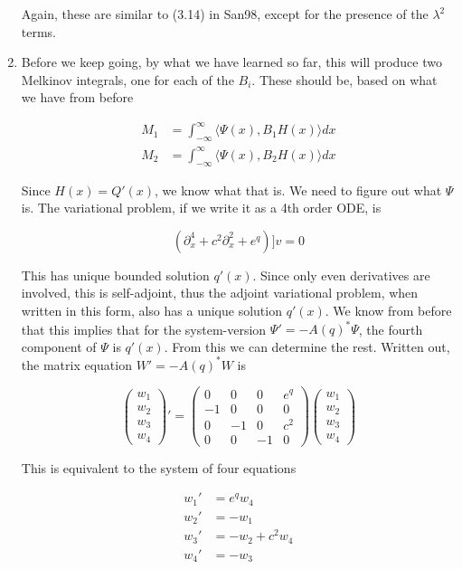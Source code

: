 \documentclass[12pt]{article}
\begin{document}
\begin{enumerate}
Again, these are similar to (3.14) in San98, except for the presence of the $\lambda^2$ terms.\\

\item Before we keep going, by what we have learned so far, this will produce two Melkinov integrals, one for each of the $B_i$. These should be, based on what we have from before

\begin{align*}
M_1 &= \int_{-\infty}^\infty \langle \Psi(x), B_1 H(x) \rangle dx \\
M_2 &= \int_{-\infty}^\infty \langle \Psi(x), B_2 H(x) \rangle dx
\end{align*}

Since $H(x) = Q'(x)$, we know what that is. We need to figure out what $\Psi$ is. The variational problem, if we write it as a 4th order ODE, is

\[
(\partial_x^4 + c^2 \partial_x^2 + e^{q})]v = 0
\]

This has unique bounded solution $q'(x)$. Since only even derivatives are involved, this is self-adjoint, thus the adjoint variational problem, when written in this form, also has a unique solution $q'(x)$. We know from before that this implies that for the system-version $\Psi' = -A(q)^* \Psi$, the fourth component of $\Psi$ is $q'(x)$. From this we can determine the rest. Written out, the matrix equation $W' = -A(q)^* W$ is

\begin{equation}
\begin{pmatrix}w_1 \\ w_2 \\ w_3 \\ w_4 \end{pmatrix}' =
\begin{pmatrix}
0 & 0 & 0 & e^q \\
-1 & 0 & 0 & 0 \\
0 & -1 & 0 & c^2 \\
0 & 0 & -1 & 0 
\end{pmatrix}
\begin{pmatrix}w_1 \\ w_2 \\ w_3 \\ w_4 \end{pmatrix}
\end{equation}

This is equivalent to the system of four equations

\begin{align*}
w_1' &= e^q w_4 \\
w_2' &= -w_1 \\
w_3' &= -w_2 + c^2 w_4 \\
w_4' &= -w_3
\end{align*}


\end{enumerate}
\end{document}
